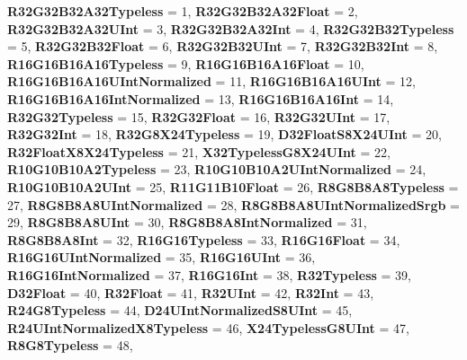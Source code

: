 \begin{DoxyCompactItemize}
{\bfseries R32\+G32\+B32\+A32\+Typeless} = 1, 
{\bfseries R32\+G32\+B32\+A32\+Float} = 2, 
{\bfseries R32\+G32\+B32\+A32\+U\+Int} = 3, 
{\bfseries R32\+G32\+B32\+A32\+Int} = 4, 
\newline
{\bfseries R32\+G32\+B32\+Typeless} = 5, 
{\bfseries R32\+G32\+B32\+Float} = 6, 
{\bfseries R32\+G32\+B32\+U\+Int} = 7, 
{\bfseries R32\+G32\+B32\+Int} = 8, 
\newline
{\bfseries R16\+G16\+B16\+A16\+Typeless} = 9, 
{\bfseries R16\+G16\+B16\+A16\+Float} = 10, 
{\bfseries R16\+G16\+B16\+A16\+U\+Int\+Normalized} = 11, 
{\bfseries R16\+G16\+B16\+A16\+U\+Int} = 12, 
\newline
{\bfseries R16\+G16\+B16\+A16\+Int\+Normalized} = 13, 
{\bfseries R16\+G16\+B16\+A16\+Int} = 14, 
{\bfseries R32\+G32\+Typeless} = 15, 
{\bfseries R32\+G32\+Float} = 16, 
\newline
{\bfseries R32\+G32\+U\+Int} = 17, 
{\bfseries R32\+G32\+Int} = 18, 
{\bfseries R32\+G8\+X24\+Typeless} = 19, 
{\bfseries D32\+Float\+S8\+X24\+U\+Int} = 20, 
\newline
{\bfseries R32\+Float\+X8\+X24\+Typeless} = 21, 
{\bfseries X32\+Typeless\+G8\+X24\+U\+Int} = 22, 
{\bfseries R10\+G10\+B10\+A2\+Typeless} = 23, 
{\bfseries R10\+G10\+B10\+A2\+U\+Int\+Normalized} = 24, 
\newline
{\bfseries R10\+G10\+B10\+A2\+U\+Int} = 25, 
{\bfseries R11\+G11\+B10\+Float} = 26, 
{\bfseries R8\+G8\+B8\+A8\+Typeless} = 27, 
{\bfseries R8\+G8\+B8\+A8\+U\+Int\+Normalized} = 28, 
\newline
{\bfseries R8\+G8\+B8\+A8\+U\+Int\+Normalized\+Srgb} = 29, 
{\bfseries R8\+G8\+B8\+A8\+U\+Int} = 30, 
{\bfseries R8\+G8\+B8\+A8\+Int\+Normalized} = 31, 
{\bfseries R8\+G8\+B8\+A8\+Int} = 32, 
\newline
{\bfseries R16\+G16\+Typeless} = 33, 
{\bfseries R16\+G16\+Float} = 34, 
{\bfseries R16\+G16\+U\+Int\+Normalized} = 35, 
{\bfseries R16\+G16\+U\+Int} = 36, 
\newline
{\bfseries R16\+G16\+Int\+Normalized} = 37, 
{\bfseries R16\+G16\+Int} = 38, 
{\bfseries R32\+Typeless} = 39, 
{\bfseries D32\+Float} = 40, 
\newline
{\bfseries R32\+Float} = 41, 
{\bfseries R32\+U\+Int} = 42, 
{\bfseries R32\+Int} = 43, 
{\bfseries R24\+G8\+Typeless} = 44, 
\newline
{\bfseries D24\+U\+Int\+Normalized\+S8\+U\+Int} = 45, 
{\bfseries R24\+U\+Int\+Normalized\+X8\+Typeless} = 46, 
{\bfseries X24\+Typeless\+G8\+U\+Int} = 47, 
{\bfseries R8\+G8\+Typeless} = 48, 
\newline

\end{DoxyCompactItemize}
